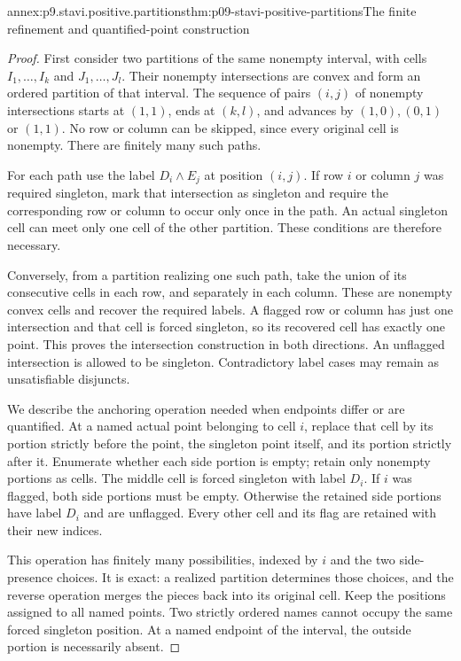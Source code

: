 \begin{annexitem}{annex:p9.stavi.positive.partitions}{thm:p09-stavi-positive-partitions}{The finite refinement and quantified-point construction}
\begin{proof}
First consider two partitions of the same nonempty interval,
with cells \(I_1,\ldots,I_k\) and \(J_1,\ldots,J_l\).
Their nonempty intersections are convex and form an ordered
partition of that interval. The sequence of pairs \((i,j)\)
of nonempty intersections starts at \((1,1)\), ends at
\((k,l)\), and advances by \((1,0),(0,1)\) or \((1,1)\).
No row or column can be skipped, since every original cell
is nonempty. There are finitely many such paths.

For each path use the label \(D_i\land E_j\) at
position \((i,j)\). If row \(i\) or column \(j\)
was required singleton, mark that intersection as
singleton and require the corresponding row or
column to occur only once in the path. An actual
singleton cell can meet only one cell of the
other partition. These conditions are therefore
necessary.

Conversely, from a partition realizing one such
path, take the union of its consecutive cells
in each row, and separately in each column.
These are nonempty convex cells and recover
the required labels. A flagged row or column
has just one intersection and that cell is
forced singleton, so its recovered cell has
exactly one point. This proves the intersection
construction in both directions. An unflagged
intersection is allowed to be singleton.
Contradictory label cases may remain as
unsatisfiable disjuncts.

We describe the anchoring operation needed
when endpoints differ or are quantified.
At a named actual point belonging to cell
\(i\), replace that cell by its portion
strictly before the point, the singleton
point itself, and its portion strictly
after it. Enumerate whether each side
portion is empty; retain only nonempty
portions as cells. The middle cell is
forced singleton with label \(D_i\).
If \(i\) was flagged, both side portions
must be empty. Otherwise the retained
side portions have label \(D_i\) and
are unflagged. Every other cell and
its flag are retained with their
new indices.

This operation has finitely many
possibilities, indexed by \(i\)
and the two side-presence choices.
It is exact: a realized partition
determines those choices, and the
reverse operation merges the
pieces back into its original
cell. Keep the positions assigned
to all named points. Two strictly
ordered names cannot occupy the
same forced singleton position.
At a named endpoint of the
interval, the outside portion
is necessarily absent.


\end{proof}
\end{annexitem}
